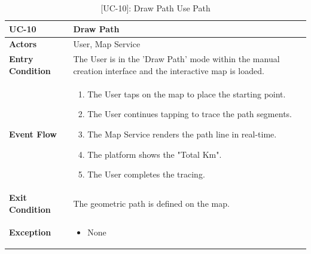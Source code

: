 \begin{table}[H]
    \centering
    \setlength\extrarowheight{2pt}
    \renewcommand{\arraystretch}{1.2}
    \begin{tabularx}{\textwidth}{|>{\bfseries}l|X|}
    \hline
    UC-10 & Draw Path \\ \hline
    Actors & User, Map Service\\ \hline
    Entry Condition & The User is in the 'Draw Path' mode within the manual creation interface and the interactive map is loaded.\\ \hline
    Event Flow & 
    \begin{enumerate}
      \item The User taps on the map to place the starting point.
      \item The User continues tapping to trace the path segments.
      \item The Map Service renders the path line in real-time.
      \item The platform shows the "Total Km".
      \item The User completes the tracing.
    \end{enumerate}
    \\ \hline
    Exit Condition &  The geometric path is defined on the map.\\ \hline
    Exception & 
    \begin{itemize}
        \item None
    \end{itemize}
    \\ \hline
   \end{tabularx}
   \caption{[UC-10]: Draw Path Use Path}
    \label{UC-10}
\end{table}

